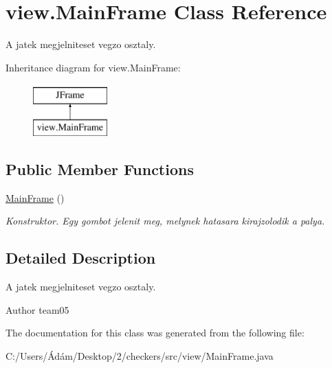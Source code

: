 \hypertarget{classview_1_1_main_frame}{}\section{view.\+Main\+Frame Class Reference}
\label{classview_1_1_main_frame}


A jatek megjelniteset vegzo osztaly.  


Inheritance diagram for view.\+Main\+Frame\+:\begin{figure}[H]
\begin{center}
\leavevmode
\includegraphics[height=2.000000cm]{classview_1_1_main_frame}
\end{center}
\end{figure}
\subsection*{Public Member Functions}
\begin{DoxyCompactItemize}
\item 
\hypertarget{classview_1_1_main_frame_a6b1386d4f506e5d1ecb4b14e9884ace8}{}\hyperlink{classview_1_1_main_frame_a6b1386d4f506e5d1ecb4b14e9884ace8}{Main\+Frame} ()\label{classview_1_1_main_frame_a6b1386d4f506e5d1ecb4b14e9884ace8}

\begin{DoxyCompactList}\small\item\em Konstruktor. Egy gombot jelenit meg, melynek hatasara kirajzolodik a palya. \end{DoxyCompactList}\end{DoxyCompactItemize}


\subsection{Detailed Description}
A jatek megjelniteset vegzo osztaly. 

\begin{DoxyAuthor}{Author}
team05 
\end{DoxyAuthor}


The documentation for this class was generated from the following file\+:\begin{DoxyCompactItemize}
\item 
C\+:/\+Users/Ádám/\+Desktop/2/checkers/src/view/Main\+Frame.\+java\end{DoxyCompactItemize}
